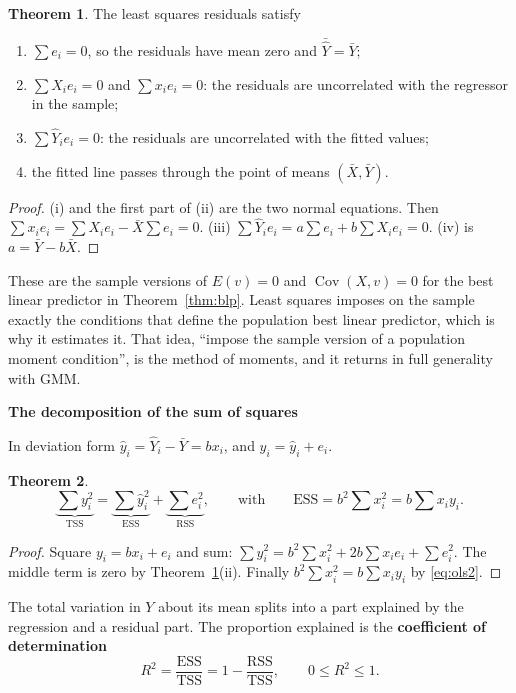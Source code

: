 \documentclass[11pt,a4paper]{article}
\numberwithin{equation}{section}
\DeclareMathOperator{\Cov}{Cov}
\theoremstyle{definition}
\newtheorem{thm}{Theorem}[subsection]
\newcommand{\subhead}[1]{%
  \par\medskip\noindent\textbf{#1}\par\nobreak\smallskip}
\begin{document}
\begin{thm}
\label{thm:resid2}
The least squares residuals satisfy
\begin{enumerate}[label=(\roman*)]
\item $\sum e_i = 0$, so the residuals have mean zero and $\bar{\hat Y} = \bar Y$;
\item $\sum X_i e_i = 0$ and $\sum x_i e_i = 0$: the residuals are uncorrelated with the regressor in the sample;
\item $\sum \hat Y_i e_i = 0$: the residuals are uncorrelated with the fitted values;
\item the fitted line passes through the point of means $(\bar X, \bar Y)$.
\end{enumerate}
\end{thm}

\begin{proof}
(i) and the first part of (ii) are the two normal equations. Then $\sum x_ie_i = \sum X_ie_i - \bar X\sum e_i = 0$.
(iii) $\sum \hat Y_ie_i = a\sum e_i + b\sum X_ie_i = 0$. (iv) is $a = \bar Y - b\bar X$.
\end{proof}

These are the sample versions of $E(v) = 0$ and $\Cov(X, v) = 0$ for the best linear predictor in Theorem~\ref{thm:blp}. Least squares imposes on
the sample exactly the conditions that define the population best linear predictor, which is why it estimates it. That idea, ``impose the sample
version of a population moment condition'', is the method of moments, and it returns in full generality with GMM.

\subhead{The decomposition of the sum of squares}
In deviation form $\hat y_i = \hat Y_i - \bar Y = bx_i$, and $y_i = \hat y_i + e_i$.

\begin{thm}
\label{thm:anova2}
\[
\underbrace{\sum y_i^2}_{\text{TSS}} = \underbrace{\sum \hat y_i^2}_{\text{ESS}} + \underbrace{\sum e_i^2}_{\text{RSS}},
\qquad\text{with}\qquad \text{ESS} = b^2\sum x_i^2 = b\sum x_iy_i .
\]
\end{thm}

\begin{proof}
Square $y_i = bx_i + e_i$ and sum: $\sum y_i^2 = b^2\sum x_i^2 + 2b\sum x_ie_i + \sum e_i^2$. The middle term is zero by
Theorem~\ref{thm:resid2}(ii). Finally $b^2\sum x_i^2 = b\sum x_iy_i$ by \eqref{eq:ols2}.
\end{proof}

The total variation in $Y$ about its mean splits into a part explained by the regression and a residual part. The proportion explained is the
\textbf{coefficient of determination}
\[
R^2 = \frac{\text{ESS}}{\text{TSS}} = 1 - \frac{\text{RSS}}{\text{TSS}}, \qquad 0 \leq R^2 \leq 1 .
\]
\end{document}
